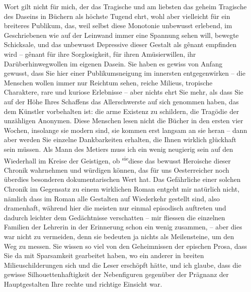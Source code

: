                Wort gilt nicht für mich, der das Tragische und am liebsten das geheim Tragische des
               Daseins in Büchern als höchste Tugend ehrt, wohl aber vielleicht für ein breiteres
               Publikum, das, weil selbst diese Monotonie unbewusst erlebend, im Geschriebenen wie
               auf der Leinwand immer eine Spannung sehen will, bewegte Schicksale, und das
               unbewusst Depressive dieser Gestalt als gênant empfinden wird – gênant für ihre
               Sorglosigkeit, für ihren Amüsierwillen, ihr Darüberhinwegwollen im eigenen Dasein.
               Sie haben es gewiss von Anfang gewusst, dass Sie hier einer Publikumsneigung im
               innersten entgegenwirken – die Menschen wollen immer nur Reichtum sehen, reiche
               Milieus, tropische Charaktere, rare und kuriose Erlebnisse – aber nichts ehrt Sie
               mehr, als dass Sie auf der Höhe Ihres Schaffens das Allerschwerste auf sich genommen
               haben, das dem Künstler vorbehalten ist: die arme Existenz zu schildern, die Tragödie
               der unzähligen Anonymen. Diese Menschen lesen nicht die Bücher in den ersten vier
               Wochen, insolange sie modern sind, sie kommen erst langsam an sie heran – dann aber
               werden Sie einzelne Dankbarkeiten erhalten, die Ihnen wirklich glückhaft sein müssen.
               Als Mann des Metiers muss ich ein wenig neugierig sein auf den Wiederhall im Kreise
               der Geistigen, ob \substVorne{}\textsuperscript{sie}\substDazwischen{}diese\substHinten{} das bewusst Heroische dieser Chronik wahrnehmen und würdigen können, das für
               uns Oesterreicher noch überdies besonderen
               dokumentarischen Wert hat. Das Gefährlich\introOben{}e\introOben{} einer solchen
                  Chronik im Gegensatz zu
               einem wirk{\pb}lichen Roman entgeht mir
               natürlich nicht, nämlich dass im Roman alle Gestalten auf Wiederkehr gestellt sind,
               also dramenhaft, während hier die meisten nur einmal episodisch auftreten und dadurch
               leichter dem Gedächtnisse verschatten – mir fliessen die einzelnen Familien der
               Lehrerin in der Erinnerung schon ein wenig zusammen, \introOben{}–\introOben{} aber
               dies war nicht zu vermeiden, denn sie bedeuten ja nichts als Meilensteine, um den Weg
               zu messen. Sie wissen so viel von den Geheimnissen der epischen Prosa, dass Sie da
               mit Sparsamkeit gearbeitet haben, wo ein anderer in breiten Milieuschilderungen sich
               und die Leser erschöpft hätte, und ich glaube, dass die gewisse Silhouettenhaftigkeit
               der Nebenfiguren gegenüber der Prägnanz der Hauptgestalten Ihre rechte und richtige
               Einsicht war.\pend
           
